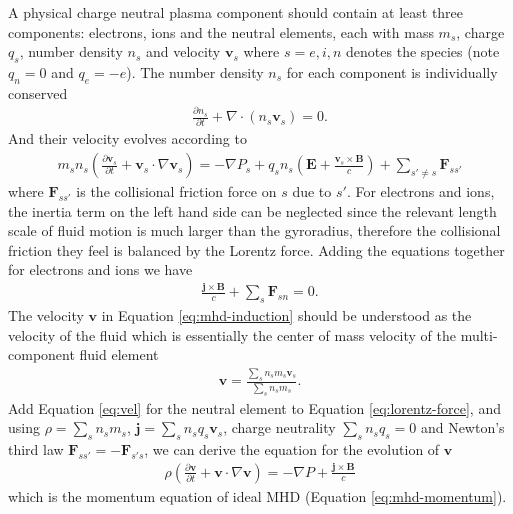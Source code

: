 A physical charge neutral plasma component should contain at least three components: electrons, ions and the neutral elements, each with mass $m_s$, charge $q_s$, number density $n_s$ and velocity $\boldsymbol{v}_s$ where $s=e,i,n$ denotes the species (note $q_n=0$ and $q_e=-e$).
The number density $n_s$ for each component is individually conserved
\begin{eqnarray}
	\frac{\partial n_s}{\partial t} + \nabla\cdot (n_s \boldsymbol{v}_s) = 0.
\end{eqnarray}
And their velocity evolves according to
\begin{eqnarray}\label{eq:vel}
		m_s n_s \left(\frac{\partial \boldsymbol{v}_s}{\partial t} + \boldsymbol{v}_s\cdot \nabla \boldsymbol{v}_s\right) = -\nabla P_s +q_s n_s \left(\boldsymbol{E} + \frac{ \boldsymbol{v}_s\times \boldsymbol{B}}{c}\right) + \sum\limits_{s'\neq s}\boldsymbol{F}_{s s'}
\end{eqnarray}
where $\boldsymbol{F}_{s s'}$ is the collisional friction force on $s$ due to $s'$.
For electrons and ions, the inertia term on the left hand side can be neglected since the relevant length scale of fluid motion is much larger than the gyroradius, therefore the collisional friction they feel is balanced by the Lorentz force.
Adding the equations together for electrons and ions we have
\begin{eqnarray}\label{eq:lorentz-force}
	\frac{\boldsymbol{j}\times\boldsymbol{B}}{c} + \sum\limits_s\boldsymbol{F}_{sn} = 0.
\end{eqnarray}
The velocity $\boldsymbol{v}$ in Equation \ref{eq:mhd-induction} should be understood as the velocity of the fluid which is essentially the center of mass velocity of the multi-component fluid element
\begin{eqnarray}
	\boldsymbol{v} = \frac{\sum\limits_s n_s m_s \boldsymbol{v}_s}{\sum\limits_s n_s m_s}.
\end{eqnarray}
Add Equation \ref{eq:vel} for the neutral element to Equation \ref{eq:lorentz-force}, and using $\rho = \sum\limits_s n_s m_s$, $\boldsymbol{j} = \sum\limits_s n_s q_s\boldsymbol{v}_s$, charge neutrality $\sum\limits_s n_s q_s = 0$ and Newton's third law $\boldsymbol{F}_{s s'}=-\boldsymbol{F}_{s' s}$, we can derive the equation for the evolution of $\boldsymbol{v}$
\begin{eqnarray}
	\rho \left(\frac{\partial \boldsymbol{v}}{\partial t} + \boldsymbol{v}\cdot \nabla \boldsymbol{v}\right) = -\nabla P +\frac{ \boldsymbol{j}\times \boldsymbol{B}}{c} 
\end{eqnarray}
which is the momentum equation of ideal MHD (Equation \ref{eq:mhd-momentum}).

